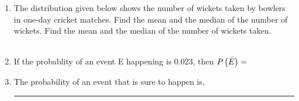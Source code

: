 \documentclass[journal,12pt,twocolumn]{IEEEtran}
\begin{document}
\begin{enumerate}
     \vspace{2mm}\\
    \vspace{2mm}\\
    \item The distribution given below shows the number of wickets taken by bowlers in one-day cricket matches. Find the mean and the median of the number of wickets. Find the mean and the median of the number of wickets taken.\\
     \vspace{2mm}\\
	\item If the probablity of an event E happening is 0.023, then $P\left(\bar{E}\right) = $\\

\item The probability of an event that is sure to happen is, \rule{1.5cm}{0.15mm}\\





\end{enumerate}
\end{document}
